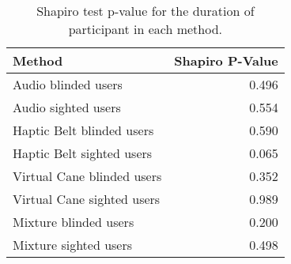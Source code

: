 
\begin{table}[!htb]
\centering
\caption{Shapiro test p-value for the duration of participant in each method.}
\label{tab:shapiro_duration}
\begin{tabular}{lr}
\toprule
                    Method &  Shapiro P-Value \\
\midrule
       Audio blinded users &            0.496 \\
       Audio sighted users &            0.554 \\
 Haptic Belt blinded users &            0.590 \\
 Haptic Belt sighted users &            0.065 \\
Virtual Cane blinded users &            0.352 \\
Virtual Cane sighted users &            0.989 \\
     Mixture blinded users &            0.200 \\
     Mixture sighted users &            0.498 \\
\bottomrule
\end{tabular}
\end{table}

